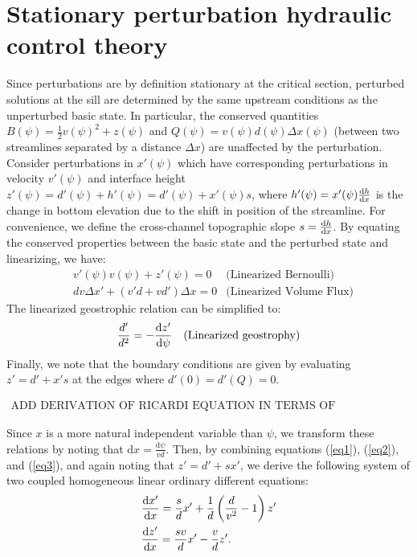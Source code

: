 \documentclass{jfm}
\begin{document}
\section{Stationary perturbation hydraulic control theory}

Since perturbations are by definition stationary at the critical section, perturbed solutions at the sill are determined by the same upstream conditions as the unperturbed basic state. In particular, the conserved quantities $B(\psi) = \frac{1}{2}v(\psi)^{2} + z(\psi)$ and $Q(\psi) = v(\psi)d(\psi)\Delta x(\psi)$ (between two streamlines separated by a distance $\Delta x$) are unaffected by the perturbation. Consider perturbations in $x'(\psi)$ which have corresponding perturbations in velocity $v'(\psi)$ and interface height $z'(\psi) = d'(\psi) + h'(\psi) = d'(\psi) + x'(\psi)s$, where $h'(\psi)=x'(\psi)\dv{h}{x}$ is the change in bottom elevation due to the shift in position of the streamline. For convenience, we define the cross-channel topographic slope $s=\dv{h}{x}$. By equating the conserved properties between the basic state and the perturbed state and linearizing, we have:
\begin{align}
& v'(\psi)v(\psi) + z'(\psi) = 0 & \text{(Linearized Bernoulli)} \label{eq1} \\
& dv \Delta x' + (v'd+ vd') \Delta x = 0 & \text{(Linearized Volume Flux)} \label{eq2} 
\end{align}
The linearized geostrophic relation can be simplified to:
\begin{align}
& \frac{d'}{d^{2}} = - \dv{z'}{\psi} & \text{(Linearized geostrophy)} \label{eq3} 
\end{align}
Finally, we note that the boundary conditions are given by evaluating $z' = d' + x's$ at the edges where $d'(0)=d'(Q)=0$.

\begin{gather}
    \text{ADD DERIVATION OF RICARDI EQUATION IN TERMS OF STREAMFUNCTION}
\end{gather}

Since $x$ is a more natural independent variable than $\psi$, we transform these relations by noting that $\text{d}x = \frac{\text{d}\psi}{vd}$. Then, by combining equations (\ref{eq1}), (\ref{eq2}), and (\ref{eq3}), and again noting that $z'=d'+sx'$, we derive the following system of two coupled homogeneous linear ordinary different equations:
\begin{align}
& \dv{x'}{x} = \frac{s}{d}x' + \frac{1}{d} \left( \frac{d}{v^{2}} - 1 \right) z' \\
& \dv{z'}{x} = \frac{s v}{d} x' - \frac{v}{d}z'.
\end{align}
\end{document}
